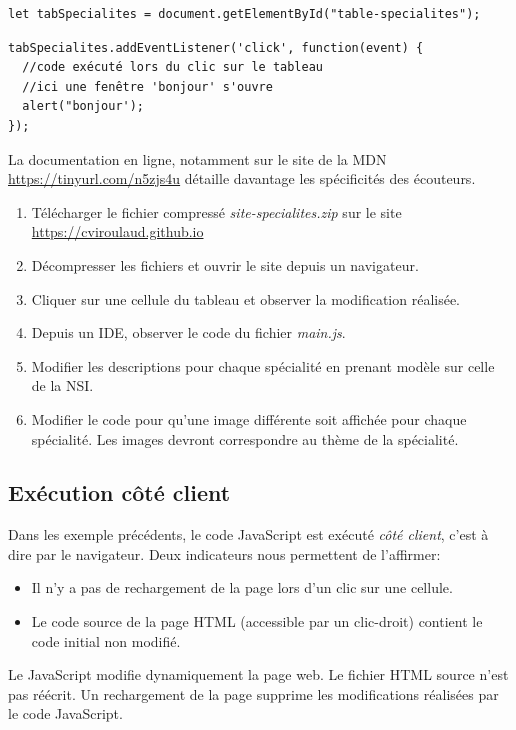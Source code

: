 \documentclass[a4paper,11pt]{article}
\begin{document}
\begin{Form}
\begin{center}
\begin{lstlisting}[language=HTML]
let tabSpecialites = document.getElementById("table-specialites");
\end{lstlisting}
\label{moncode}
\end{center}
\begin{center}
\begin{lstlisting}
tabSpecialites.addEventListener('click', function(event) {
  //code exécuté lors du clic sur le tableau
  //ici une fenêtre 'bonjour' s'ouvre
  alert("bonjour');
});
\end{lstlisting}
\label{moncode}
\end{center}

La documentation en ligne, notamment sur le site de la MDN \mbox{\url{https://tinyurl.com/n5zjs4u}} détaille davantage les spécificités des écouteurs.

\begin{activite}
\begin{enumerate}
\item Télécharger le fichier compressé \emph{site-specialites.zip} sur le site \mbox{\url{https://cviroulaud.github.io}}
\item Décompresser les fichiers et ouvrir le site depuis un navigateur.
\item Cliquer sur une cellule du tableau et observer la modification réalisée.
\item Depuis un IDE, observer le code du fichier \emph{main.js}.
\item Modifier les descriptions pour chaque spécialité en prenant modèle sur celle de la NSI.
\item Modifier le code pour qu'une image différente soit affichée pour chaque spécialité. Les images devront correspondre au thème de la spécialité.
\end{enumerate}
\end{activite}
\subsection{Exécution côté client}
Dans les exemple précédents, le code JavaScript est exécuté \emph{côté client}, c'est à dire par le navigateur. Deux indicateurs nous permettent de l'affirmer:
\begin{itemize}
\item Il n'y a pas de rechargement de la page lors d'un clic sur une cellule.
\item Le code source de la page HTML (accessible par un clic-droit) contient le code initial non modifié.
\end{itemize}
\begin{aretenir}[]
Le JavaScript modifie dynamiquement la page web. Le fichier HTML source n'est pas réécrit. Un rechargement de la page supprime les modifications réalisées par le code JavaScript.
\end{aretenir}
\end{Form}
\end{document}
